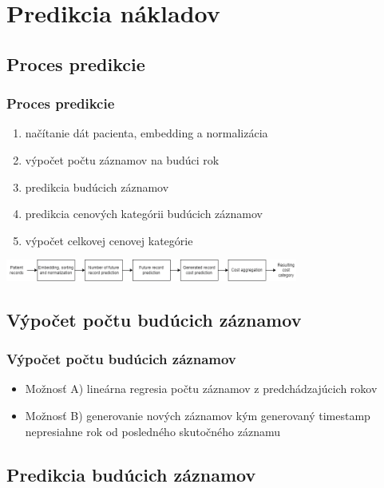 \documentclass[slovak]{beamer}
\begin{document}
\section{Predikcia nákladov}

\subsection{Proces predikcie}

\begin{frame}
	\frametitle{Proces predikcie}
	\begin{enumerate}
		\item<1> načítanie dát pacienta, embedding a normalizácia
		\item<1> výpočet počtu záznamov na budúci rok
		\item<1> predikcia budúcich záznamov
		\item<1> predikcia cenových kategórii budúcich záznamov
		\item<1> výpočet celkovej cenovej kategórie
	\end{enumerate}
	\includegraphics[height=0.7cm]{images/model_workflow.png}
\end{frame}

\subsection{Výpočet počtu budúcich záznamov}

\begin{frame}
	\frametitle{Výpočet počtu budúcich záznamov}
	\begin{itemize}
		\item<1> Možnosť A) lineárna regresia počtu záznamov z predchádzajúcich rokov
		\item<1> Možnosť B) generovanie nových záznamov kým generovaný timestamp nepresiahne rok od posledného skutočného záznamu
	\end{itemize}
\end{frame}

\subsection{Predikcia budúcich záznamov}
\end{document}
